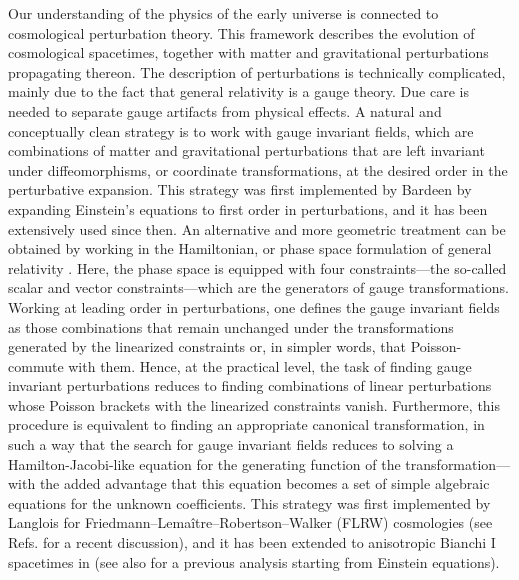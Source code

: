 \documentclass[11pt,tightenlines,eqsecnum,floats,aps,amsmath,amssymb,nofootinbib,prd,floatfix]{revtex4}
\newcommand{\<}{\langle}
\renewcommand{\>}{\rangle}
\begin{document}
Our understanding of the physics of the early universe is connected to cosmological perturbation theory. This framework describes the evolution of cosmological spacetimes, together with matter and gravitational perturbations propagating thereon. The description of perturbations  is technically complicated, mainly due to the fact that general relativity is a gauge theory. Due care is needed to separate gauge artifacts from physical effects. A natural and conceptually clean strategy is to work with gauge invariant fields, which are combinations of matter and gravitational perturbations that are left invariant under diffeomorphisms, or coordinate transformations, at the desired order in the perturbative expansion. This strategy was first implemented by Bardeen \cite{brdn} by expanding Einstein's equations to first order in perturbations, and it has been extensively used since then. An alternative and more geometric treatment can be obtained by working in the Hamiltonian, or phase space formulation of general relativity \cite{Arnowitt:1962hi}. Here, the phase space is equipped with four constraints---the so-called scalar and vector constraints---which are the generators of gauge transformations. Working at leading order in perturbations, one defines the gauge invariant fields as those combinations that remain unchanged under the transformations generated by the linearized constraints or, in simpler words, that Poisson-commute with them. Hence, at the practical level,  the task of finding gauge invariant perturbations reduces to finding combinations of linear perturbations whose Poisson brackets with the linearized constraints vanish. Furthermore, this procedure is equivalent to finding an appropriate canonical transformation, in such a way that the search for gauge invariant fields reduces to solving a Hamilton-Jacobi-like equation for the generating function of the transformation---with the added advantage that this equation becomes 
a set of simple algebraic equations for the unknown coefficients. This strategy was first implemented by Langlois \cite{lang} for Friedmann--Lema\^itre--Robertson--Walker (FLRW) cosmologies (see Refs. \cite{aan1,aan2,hyb1,hyb2} for a recent discussion), and it has been extended to anisotropic Bianchi I spacetimes in \cite{aos} (see also \cite{Pereira:2007yy,Pitrou:2008gk} for a previous analysis starting from Einstein equations).  
\end{document}
